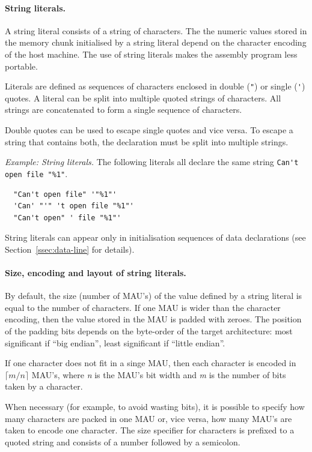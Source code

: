 \documentclass[twoside]{tceusermanual}
\begin{document}
\paragraph{String literals.}

A string literal consists of a string of characters. The the numeric values
stored in the memory chunk initialised by a string literal depend on the
character encoding of the host machine.
%
%
The use of string literals makes the assembly program less portable.

Literals are defined as sequences of characters enclosed in double
(\verb|"|) or single (\verb|'|) quotes. A literal can be split into multiple
quoted strings of characters. All strings are concatenated to form a single
sequence of characters.

Double quotes can be used to escape single quotes and vice versa. To escape
a string that contains both, the declaration must be split into multiple
strings.

\emph{Example: String literals.}
The following literals all declare the same string 
\verb|Can't open file "%1"|.
%
\begin{verbatim}
  "Can't open file" '"%1"'
  'Can' "'" 't open file "%1"'
  "Can't open" ' file "%1"'
\end{verbatim}

String literals can appear only in initialisation sequences of data
declarations (see Section~\ref{ssec:data-line} for details).

\paragraph{Size, encoding and layout of string literals.}
By default, the size (number of MAU's) of the value defined by a string
literal is equal to the number of characters. If one MAU is wider than the
character encoding, then the value stored in the MAU is padded with zeroes.
The position of the padding bits depends on the byte-order of the target
architecture: most significant if ``big endian'', least significant if
``little endian''.

If one character does not fit in a singe MAU, then each character is encoded
in $\lceil m/n \rceil$ MAU's, where \emph{n} is the MAU's bit width and
\emph{m} is the number of bits taken by a character.

When necessary (for example, to avoid wasting bits), it is possible to
specify how many characters are packed in one MAU or, vice versa, how many
MAU's are taken to encode one character.
%
The size specifier for characters is prefixed to a quoted string and
consists of a number followed by a semicolon.
\end{document}

